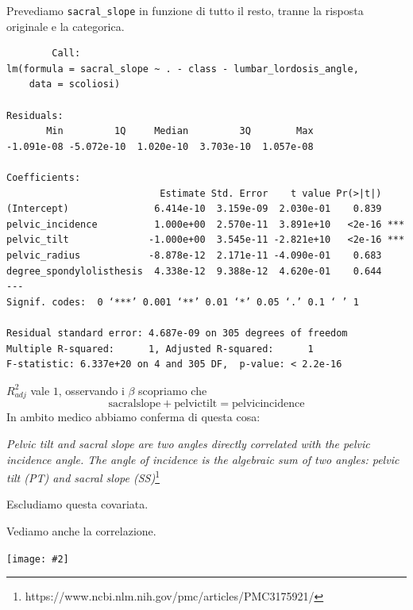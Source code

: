 \documentclass{beamer}
\newcommand{\fg}[2]{%
  \begin{center}
      \texttt{[image: \#2]}%
  \end{center}
}
\begin{document}
\begin{frame}[fragile]
	Prevediamo \texttt{sacral\_slope} in funzione di tutto il resto, tranne la risposta originale e la categorica.

	{\tiny
	\begin{verbatim}
		Call:
lm(formula = sacral_slope ~ . - class - lumbar_lordosis_angle, 
    data = scoliosi)

Residuals:
       Min         1Q     Median         3Q        Max 
-1.091e-08 -5.072e-10  1.020e-10  3.703e-10  1.057e-08 

Coefficients:
                           Estimate Std. Error    t value Pr(>|t|)    
(Intercept)               6.414e-10  3.159e-09  2.030e-01    0.839    
pelvic_incidence          1.000e+00  2.570e-11  3.891e+10   <2e-16 ***
pelvic_tilt              -1.000e+00  3.545e-11 -2.821e+10   <2e-16 ***
pelvic_radius            -8.878e-12  2.171e-11 -4.090e-01    0.683    
degree_spondylolisthesis  4.338e-12  9.388e-12  4.620e-01    0.644    
---
Signif. codes:  0 ‘***’ 0.001 ‘**’ 0.01 ‘*’ 0.05 ‘.’ 0.1 ‘ ’ 1

Residual standard error: 4.687e-09 on 305 degrees of freedom
Multiple R-squared:      1,	Adjusted R-squared:      1 
F-statistic: 6.337e+20 on 4 and 305 DF,  p-value: < 2.2e-16
	\end{verbatim}
	}
\end{frame}


\begin{frame}
	$R^{2}_{adj}$ vale $1$, osservando i $\beta$ scopriamo che
	$$ \text{sacralslope} + \text{pelvictilt} = \text{pelvicincidence}$$
	In ambito medico abbiamo conferma di questa cosa:

	\textit{Pelvic tilt and sacral slope are two angles directly correlated with the pelvic incidence angle. The angle of incidence is the algebraic sum of two angles: pelvic tilt (PT) and sacral slope (SS)}\footnote{https://www.ncbi.nlm.nih.gov/pmc/articles/PMC3175921/}

	Escludiamo questa covariata.
\end{frame}





\begin{frame}
	Vediamo anche la correlazione.
	\fg{0.6}{01coorplot}
\end{frame}
\end{document}
